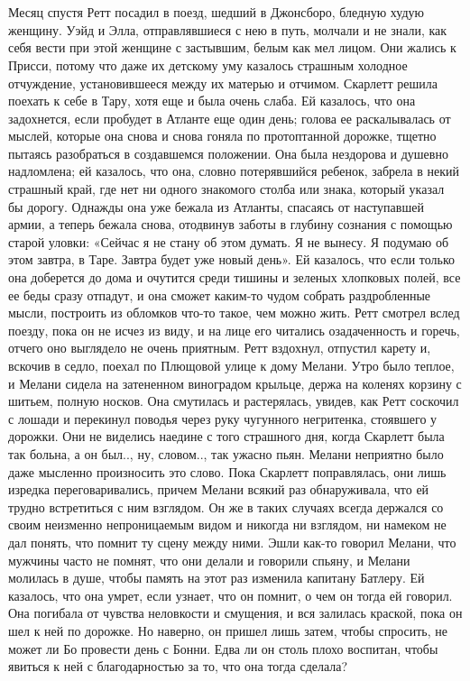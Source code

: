 \chapter{\ }

Месяц спустя Ретт посадил в поезд, шедший в Джонсборо, бледную худую женщину. Уэйд и Элла, отправлявшиеся с нею в путь, молчали и не знали, как себя вести при этой женщине с застывшим, белым как мел лицом. Они жались к Присси, потому что даже их детскому уму казалось страшным холодное отчуждение, установившееся между их матерью и отчимом.
Скарлетт решила поехать к себе в Тару, хотя еще и была очень слаба. Ей казалось, что она задохнется, если пробудет в Атланте еще один день; голова ее раскалывалась от мыслей, которые она снова и снова гоняла по протоптанной дорожке, тщетно пытаясь разобраться в создавшемся положении. Она была нездорова и душевно надломлена; ей казалось, что она, словно потерявшийся ребенок, забрела в некий страшный край, где нет ни одного знакомого столба или знака, который указал бы дорогу.
Однажды она уже бежала из Атланты, спасаясь от наступавшей армии, а теперь бежала снова, отодвинув заботы в глубину сознания с помощью старой уловки: «Сейчас я не стану об этом думать. Я не вынесу. Я подумаю об этом завтра, в Таре. Завтра будет уже новый день». Ей казалось, что если только она доберется до дома и очутится среди тишины и зеленых хлопковых полей, все ее беды сразу отпадут, и она сможет каким-то чудом собрать раздробленные мысли, построить из обломков что-то такое, чем можно жить.
Ретт смотрел вслед поезду, пока он не исчез из виду, и на лице его читались озадаченность и горечь, отчего оно выглядело не очень приятным. Ретт вздохнул, отпустил карету и, вскочив в седло, поехал по Плющовой улице к дому Мелани.
Утро было теплое, и Мелани сидела на затененном виноградом крыльце, держа на коленях корзину с шитьем, полную носков. Она смутилась и растерялась, увидев, как Ретт соскочил с лошади и перекинул поводья через руку чугунного негритенка, стоявшего у дорожки. Они не виделись наедине с того страшного дня, когда Скарлетт была так больна, а он был.., ну, словом.., так ужасно пьян. Мелани неприятно было даже мысленно произносить это слово. Пока Скарлетт поправлялась, они лишь изредка переговаривались, причем Мелани всякий раз обнаруживала, что ей трудно встретиться с ним взглядом. Он же в таких случаях всегда держался со своим неизменно непроницаемым видом и никогда ни взглядом, ни намеком не дал понять, что помнит ту сцену между ними. Эшли как-то говорил Мелани, что мужчины часто не помнят, что они делали и говорили спьяну, и Мелани молилась в душе, чтобы память на этот раз изменила капитану Батлеру. Ей казалось, что она умрет, если узнает, что он помнит, о чем он тогда ей говорил. Она погибала от чувства неловкости и смущения, и вся залилась краской, пока он шел к ней по дорожке. Но наверно, он пришел лишь затем, чтобы спросить, не может ли Бо провести день с Бонни. Едва ли он столь плохо воспитан, чтобы явиться к ней с благодарностью за то, что она тогда сделала?
